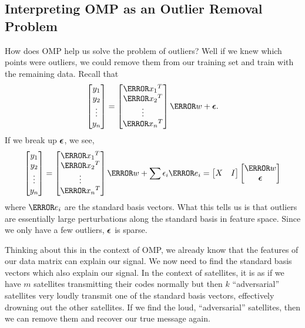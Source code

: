   \subsection{Interpreting OMP as an Outlier Removal Problem}
  How does OMP help us solve the problem of outliers? Well if we knew which points were outliers, we could remove them from our training set and train with the remaining data.
  Recall that
  \[
	\begin{bmatrix}
	  y_1\\y_2\\\vdots\\y_n
	\end{bmatrix} = \begin{bmatrix}
	  \V{x_1}^T\\\V{x_2}^T\\\vdots\\\V{x_n}^T
	\end{bmatrix}\V{w} + \bs{\epsilon}.
  \]
  If we break up $\boldsymbol{\epsilon}$, we see,
  \[
	\begin{bmatrix}
	  y_1\\y_2\\\vdots\\y_n
	\end{bmatrix} = \begin{bmatrix}
	  \V{x_1}^T\\\V{x_2}^T\\\vdots\\\V{x_n}^T
	\end{bmatrix}\V{w} + \sum \epsilon_i \V{e_i} = 
	\begin{bmatrix}
	  X & I
	\end{bmatrix} \begin{bmatrix}
	  \V{w}\\ \bs{\epsilon}
	\end{bmatrix}
  \]
  where $\V{e_i}$ are the standard basis vectors.
  What this tells us is that outliers are essentially large perturbations along the standard basis in feature space.
  Since we only have a few outliers, $\boldsymbol{\epsilon}$ is sparse. 

  Thinking about this in the context of OMP, we already know that the features of our data matrix can explain our signal.
  We now need to find the standard basis vectors which also explain our signal.
  In the context of satellites, it is as if we have $m$ satellites transmitting their codes normally but then $k$ ``adversarial'' satellites very loudly transmit one of the standard basis vectors, effectively drowning out the other satellites.
  If we find the loud, ``adversarial'' satellites, then we can remove them and recover our true message again.

